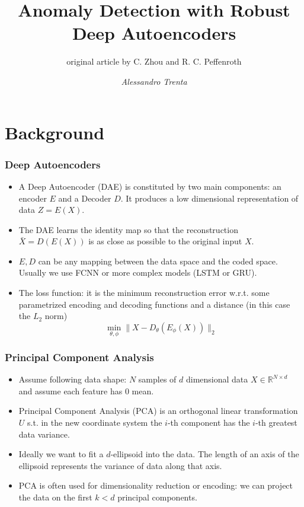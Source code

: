 \documentclass{beamer}
\title[Anomaly Detection with Robust Deep Autoencoders]{Anomaly Detection with Robust Deep Autoencoders} %
\subtitle[]{original article by C. Zhou and R. C. Peffenroth}
\author[Alessandro Trenta]{\emph{Alessandro Trenta}} %
\institute[SNS] %
{Scuola Normale Superiore \\ %
}
\date{} %
\theoremstyle{plain}
\theoremstyle{definition}
\theoremstyle{remark}
\newcommand{\R}{\mathbb{R}}
\newcommand{\norm}[1]{\lVert#1\rVert}
\begin{document}
\begin{frame}
	\titlepage %
\end{frame}

\begin{frame}
	\tableofcontents
\end{frame}

\nocite{RAE}

\section{Background}

\begin{frame}
	\frametitle{Deep Autoencoders}
	\begin{itemize}
		\item A Deep Autoencoder (DAE) is constituted by two main components: an encoder $E$ and a Decoder $D$. It produces a low dimensional representation of data $Z=E(X)$.
		\item The DAE learns the identity map so that the reconstruction $\bar{X}=D(E(X))$ is as close as possible to the original input $X$.
		\item $E, D$ can be any mapping between the data space and the coded space. Usually we use FCNN or more complex models (LSTM or GRU).
		\item The loss function: it is the minimum reconstruction error w.r.t. some parametrized encoding and decoding functions and a distance (in this case the $L_2$ norm)
			\begin{equation}
				\min_{\theta, \phi}{\norm{X-D_{\theta}(E_{\phi}(X))}_{2}}
			\end{equation}
	\end{itemize}
\end{frame}

\begin{frame}
	\frametitle{Principal Component Analysis}
	\begin{itemize}
		\item Assume following data shape: $N$ samples of $d$ dimensional data $X\in \R^{N\times d}$ and assume each feature has $0$ mean.
		\item Principal Component Analysis (PCA) is an orthogonal linear transformation $U$ s.t. in the new coordinate system the $i$-th component has the $i$-th greatest data variance.
		\item Ideally we want to fit a $d$-ellipsoid into the data. The length of an axis of the ellipsoid represents the variance of data along that axis.
		\item PCA is often used for dimensionality reduction or encoding: we can project the data on the first $k<d$ principal components.
	\end{itemize}
\end{frame}
\end{document}
